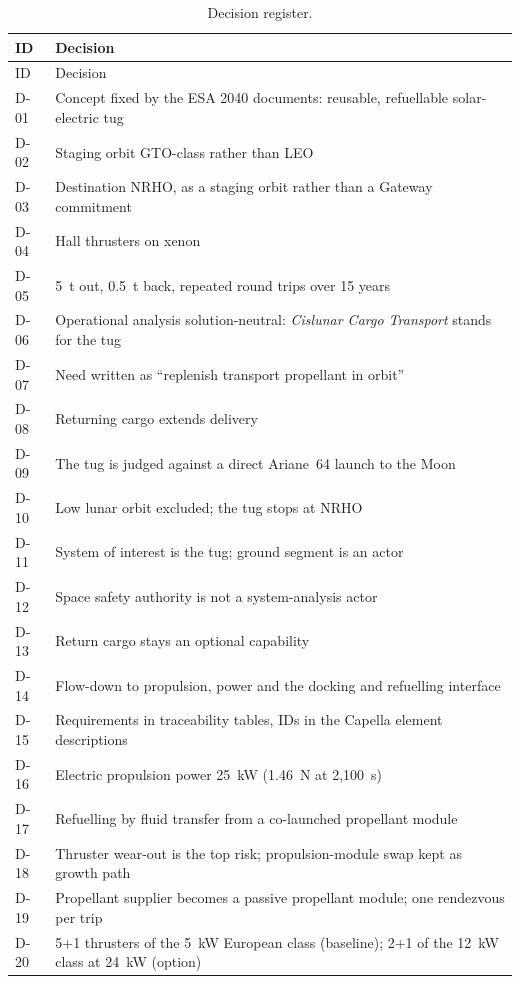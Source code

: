 \documentclass[11pt,a4paper]{article}
\newcommand{\id}[1]{#1}
\begin{document}
{\begin{longtable}{@{}P{1.0cm}P{14.4cm}@{}}
\caption{Decision register.}\label{tab:decisions}\\
\toprule
ID & Decision \\
\midrule\endfirsthead
\toprule ID & Decision \\ \midrule\endhead
\bottomrule\endfoot
\id{D-01} & Concept fixed by the ESA 2040 documents: reusable, refuellable solar-electric tug \\
\id{D-02} & Staging orbit GTO-class rather than LEO \\
\id{D-03} & Destination NRHO, as a staging orbit rather than a Gateway commitment \\
\id{D-04} & Hall thrusters on xenon \\
\id{D-05} & 5~t out, 0.5~t back, repeated round trips over 15 years \\
\id{D-06} & Operational analysis solution-neutral: \emph{Cislunar Cargo Transport} stands for the tug \\
\id{D-07} & Need written as ``replenish transport propellant in orbit'' \\
\id{D-08} & Returning cargo extends delivery \\
\id{D-09} & The tug is judged against a direct Ariane~64 launch to the Moon \\
\id{D-10} & Low lunar orbit excluded; the tug stops at NRHO \\
\id{D-11} & System of interest is the tug; ground segment is an actor \\
\id{D-12} & Space safety authority is not a system-analysis actor \\
\id{D-13} & Return cargo stays an optional capability \\
\id{D-14} & Flow-down to propulsion, power and the docking and refuelling interface \\
\id{D-15} & Requirements in traceability tables, IDs in the Capella element descriptions \\
\id{D-16} & Electric propulsion power 25~kW (1.46~N at 2,100~s) \\
\id{D-17} & Refuelling by fluid transfer from a co-launched propellant module \\
\id{D-18} & Thruster wear-out is the top risk; propulsion-module swap kept as growth path \\
\id{D-19} & Propellant supplier becomes a passive propellant module; one rendezvous per trip \\
\id{D-20} & 5+1 thrusters of the 5~kW European class (baseline); 2+1 of the 12~kW class at 24~kW (option) \\

\end{longtable}}
\end{document}
